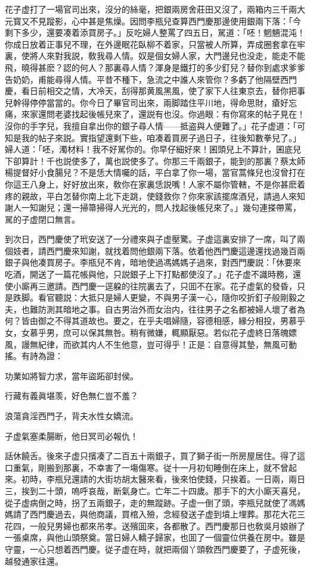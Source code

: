 花子虚打了一場官司出來，沒分的絲毫，把銀兩房舍莊田又沒了，兩箱内三千兩大元寳又不見蹤影，心中甚是焦燥。因問李瓶兒查算西門慶那邊使用銀兩下落：「今剩下多少，還要凑着添買房子。」反吃婦人整罵了四五日，駡道：「呸！魍魎混沌！你成日放着正事兒不理，在外邊眠花臥柳不着家，只當被人所算，弄成圈套拿在牢裏，使將人來對我説，敎我尋人情。奴是個女婦人家，大門邊兒也没走，能走不能飛，曉得甚麽？認的何人？那裏尋人情？渾身是鐵打的多少釘兒？替你到處求爹爹告奶奶，甫能尋得人情。平昔不種下，急流之中誰人來管你？多虧了他隔壁西門慶，看日前相交之情，大冷天，刮得那黄風黑風，使了家下人往東京去，替你把事兒幹得停停當當的。你今日了畢官司出來，兩脚踏住平川地，得命思財，瘡好忘痛，來家還問老婆找起後帳兒來了，還説有也沒。你過眼：有你寫來的帖子見在！沒你的手字兒，我擅自拿出你的銀子尋人情——抵盗與人便難了。」花子虚道：「可知是我的帖子來説。實指望還剩下些，咱凑着買房子過日子，往後知數拳兒了。」婦人道：「呸，濁材料！我不好駡你的。你早仔細好來！囷頭兒上不算計，囷底兒下卻算計！千也説使多了，萬也説使多了。你那三千兩銀子，能到的那裏？蔡太師楊提督好小食腸兒？不是恁大情囑的話，平白拿了你一場，當官蒿條兒也沒曾打在你這王八身上，好好放出來，敎你在家裏恁説嘴！人家不屬你管轄，不是你甚麽着疼的親故，平白怎替你南上北下走跳，使錢救你？你來家該擺席酒兒，請過人來知謝人一知謝兒；還一掃箒掃得人光光的，問人找起後帳兒來了。」幾句連搽帶罵，駡的子虚閉口無言。

到次日，西門慶使了玳安送了一分禮來與子虚壓驚。子虚這裏安排了一席，叫了兩個妓者，請西門慶來知謝，就找着問他銀兩下落。依着他西門慶這邊還找過幾百兩銀子與他凑買房子。李瓶兒不肯，暗地使過馮媽媽子過來，對西門慶説：「休要來吃酒，開送了一篇花帳與他，只説銀子上下打點都使沒了。」花子虚不識時務，還使小廝再三邀請。西門慶一逕躱的往院裏去了，只囬不在家。花子虚氣的發昏，只是跌脚。看官聽説：大抵只是婦人更變，不與男子漢一心，隨你咬折釘子般剛毅之夫，也難防測其暗地之事。自古男治外而女治内，往往男子之名都被婦人壞了者為何？皆由御之不得其道故也。要之，在乎夫唱婦隨，容德相感，緣分相投，男慕乎女，女慕乎男，庶可以保其無咎。稍有微嫌，輒顯厭惡。若似花子虚終日落魄嫖風，謾無紀律，而欲其内人不生他意，豈可得乎！正是：自意得其墊，無風可動搖。有詩為證：

\begin{myquote}
功業如將智力求，當年盜跖卻封侯。

行藏有義眞堪羡，好色無仁豈不羞？

浪蕩貪淫西門子，背夫水性女嬌流。

子虚氣塞柔腸断，他日冥司必報仇！
\end{myquote}

話休饒舌。後來子虚只擯凑了二百五十兩銀子，買了獅子街一所房屋居住。得了這口重氣，剛搬到那裏，不幸害了一塲傷寒。従十一月初旬睡倒在床上，就不曾起來。初時，李瓶兒還請的大街坊胡太醫來看，後來怕使錢，只挨着。一日兩，兩日三，挨到二十頭，嗚呼哀哉，断氣身亡。亡年二十四歲。那手下的大小廝天喜兒，從子虚病倒之時，拐了五兩銀子，走的無蹤跡。子虚一倒了頭，李瓶兒就使了馮媽媽請了西門慶過去，與他商議，買棺入殮，念經發送子虚到墳上埋葬。那花大花三花四，一般兒男婦也都來吊孝。送殯囬來，各都散了。西門慶那日也敎吳月娘辦了一張桌席，與他山頭祭奠。當日婦人轎子歸家，也囬了一個靈位供養在房中。雖是守靈，一心只想着西門慶。従子虚在時，就把兩個丫頭敎西門慶要了，子虚死後，越發通家往還。

